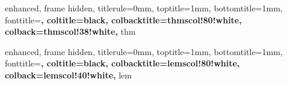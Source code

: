 
{
    enhanced,
    frame hidden,
    titlerule=0mm,
    toptitle=1mm,
    bottomtitle=1mm,
    fonttitle=\bfseries\large,
    coltitle=black,
    colbacktitle=thmscol!80!white,
    colback=thmscol!38!white,
}{thm}



\newenvironment{thmpf}{
	{\noindent{\it \textbf{Proof.}}}
	\tcolorbox[blanker,breakable,left=5mm,parbox=false,
    before upper={\parindent15pt},
    after skip=10pt,
	borderline west={1mm}{0pt}{thmscol!80!white}]
	\setlength{\parindent}{0pt}
}{
    \textcolor{thmscol!80!white}{\hbox{}\nobreak\hfill$\blacksquare$} 
    \endtcolorbox
}

\NewDocumentCommand{\thmp}{m+m+m}{
    \begin{theorem}{#1}{}
        #2
    \end{theorem}

    \begin{thmpf}
        #3
    \end{thmpf}
}


{
    enhanced,
    frame hidden,
    titlerule=0mm,
    toptitle=1mm,
    bottomtitle=1mm,
    fonttitle=\bfseries\large,
    coltitle=black,
    colbacktitle=lemscol!80!white,
    colback=lemscol!40!white,
}{lem}


\newenvironment{lempf}{
	{\noindent{\it \textbf{Proof.}}}
	\tcolorbox[blanker,breakable,left=5mm,parbox=false,
    before upper={\parindent15pt},
    after skip=10pt,
	borderline west={1mm}{0pt}{lemscol!50!white}]
	\setlength{\parindent}{0pt}
}{
    \textcolor{lemscol!50!white}{\hbox{}\nobreak\hfill$\blacksquare$} 
    \endtcolorbox
}

